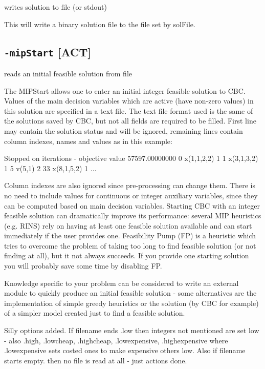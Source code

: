 \documentclass[11pt,a4paper]{article}
\newcommand{\ptag}[2]{{\scriptsize\textcolor{#1}{\textbf{[#2]}}}}
\begin{document}
writes solution to file (or stdout)

This will write a binary solution file to the file set by solFile.

\subsection*{\texttt{-mipStart} \ptag{red!65!black}{ACT}}
\addcontentsline{toc}{subsection}{\texttt{-mipStart} \ptag{red!65!black}{ACT}}

reads an initial feasible solution from file

The MIPStart allows one to enter an initial integer feasible solution to CBC. Values of the main decision variables which are active (have non-zero values) in this solution are specified in a text  file. The text file format used is the same of the solutions saved by CBC, but not all fields are required to be filled. First line may contain the solution status and will be ignored, remaining lines contain column indexes, names and values as in this example:

 Stopped on iterations - objective value 57597.00000000
      0  x(1,1,2,2)               1 
      1  x(3,1,3,2)               1 
      5  v(5,1)                   2 
      33 x(8,1,5,2)               1 
      ...

 Column indexes are also ignored since pre-processing can change them. There is no need to include values for continuous or integer auxiliary variables, since they can be computed based on main decision variables. Starting CBC with an integer feasible solution can dramatically improve its performance: several MIP heuristics (e.g. RINS) rely on having at least one feasible solution available and can start immediately if the user provides one. Feasibility Pump (FP) is a heuristic which tries to overcome the problem of taking too long to find feasible solution (or not finding at all), but it not always succeeds. If you provide one starting solution you will probably save some time by disabling FP. 

 Knowledge specific to your problem can be considered to write an external module to quickly produce an initial feasible solution - some alternatives are the implementation of simple greedy heuristics or the solution (by CBC for example) of a simpler model created just to find a feasible solution. 

 Silly options added.  If filename ends .low then integers not mentioned are set low - also .high, .lowcheap, .highcheap, .lowexpensive, .highexpensive where .lowexpensive sets costed ones to make expensive others low. Also if filename starts empty. then no file is read at all - just actions done. 
\end{document}
